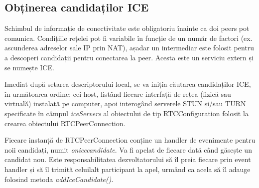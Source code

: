 \subsection{Obținerea candidaților ICE}
\label{sec:ch3sec4subsec4}

\indent \par Schimbul de informație de conectivitate este obligatoriu înainte ca doi peers pot comunica. Condițiile rețelei pot fi variabile în funcție de un număr de factori (ex. ascunderea adreselor sale IP prin NAT), așadar un intermediar este folosit pentru a descoperi candidații pentru conectarea la peer. Acesta este un serviciu extern și se numește ICE.
\indent \par Imediat după setarea descriptorului local, se va iniția căutarea candidaților ICE, în următoarea ordine: cei host, listând fiecare interfață de rețea (fizică sau virtuală) instalată pe computer, apoi interogând serverele STUN și/sau TURN specificate în câmpul \textit{iceServers} al obiectului de tip RTCConfiguration folosit la crearea obiectului RTCPeerConnection.
\indent \par Fiecare instanță de RTCPeerConnection conține un handler de evenimente pentru noii candidați, numit \textit{onicecandidate}. Va fi apelat de fiecare dată când găsește un candidat nou. Este responsabilitatea dezvoltatorului să îl preia fiecare prin event handler și să îl trimită celuilalt participant la apel, urmând ca acela să îl adauge folosind metoda \textit{addIceCandidate()}.
